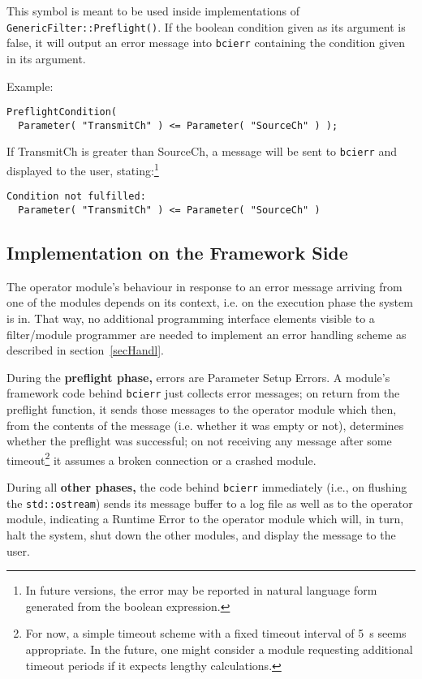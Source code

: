 \documentclass[12pt,a4paper]{article}
\begin{document}
\begin{itemize}
This symbol is meant to be used inside implementations of 
\texttt{GenericFilter::Preflight()}. If the boolean condition given as its
argument is false, it will output an error message into \texttt{bcierr} containing
the condition given in its argument.

Example:
\begin{verbatim}
PreflightCondition(
  Parameter( "TransmitCh" ) <= Parameter( "SourceCh" ) );
\end{verbatim}
If TransmitCh is greater than SourceCh, a message will be sent to \texttt{bcierr} and
displayed to the user, stating:\footnote{In future versions, the error may be reported
in natural language form generated from the boolean expression.}
\begin{verbatim}
Condition not fulfilled:
  Parameter( "TransmitCh" ) <= Parameter( "SourceCh" )
\end{verbatim}

\end{itemize}

\subsection{Implementation on the Framework Side}
\label{secImpl}

The operator module's behaviour in response to an error
message arriving from one of the modules depends
on its context, i.e. on the execution phase the system is in.
That way, no additional programming interface elements
visible to a filter/module programmer
are needed to implement an error handling scheme as
described in section~\ref{secHandl}. 

During the \textbf{preflight phase,} errors are {Parameter
Setup Errors.} A module's framework code behind
\texttt{bcierr} just collects error
messages; on return from the preflight function, it
sends those messages to the operator module which then,
from the contents of the message (i.e. whether it was empty
or not), determines whether the preflight was successful;
on not receiving any message after some timeout\footnote{
For now, a simple timeout scheme with a fixed timeout
interval of 5~s seems appropriate. In the future, one might consider
a module requesting additional timeout periods if it expects 
lengthy calculations.}
it assumes a broken connection or a crashed module.

During all \textbf{other phases,} the code behind \texttt{bcierr}
immediately (i.e., on flushing the \texttt{std::ostream})
sends its message buffer to a log file as well as to
the operator module, indicating a {Runtime Error} 
to the operator module which will, in turn, halt the system,
shut down the other modules, and display the message to the
user.
\end{document}
